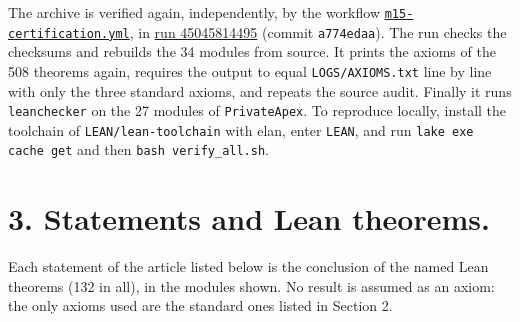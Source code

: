 \documentclass[11pt,a4paper]{article}
\newcommand{\R}{https://github.com/ralfanop/Certifications_Eulerian_polar-curve_computations}
\begin{document}
The archive is verified again, independently, by the workflow \href{\R/blob/main/.github/workflows/m15-certification.yml}{\texttt{m15-certification.yml}}, in \href{\R/actions/runs/45045814495}{run 45045814495} (commit \texttt{a774edaa}). The run checks the checksums and rebuilds the 34 modules from source. It prints the axioms of the 508 theorems again, requires the output to equal \texttt{LOGS/AXIOMS.txt} line by line with only the three standard axioms, and repeats the source audit. Finally it runs \texttt{leanchecker} on the 27 modules of \texttt{PrivateApex}. To reproduce locally, install the toolchain of \texttt{LEAN/lean-toolchain} with elan, enter \texttt{LEAN}, and run \texttt{lake exe cache get} and then \texttt{bash verify\_all.sh}.

\section*{3. Statements and Lean theorems.}
Each statement of the article listed below is the conclusion of the named Lean theorems (132 in all), in the modules shown. No result is assumed as an axiom: the only axioms used are the standard ones listed in Section 2.
\end{document}
